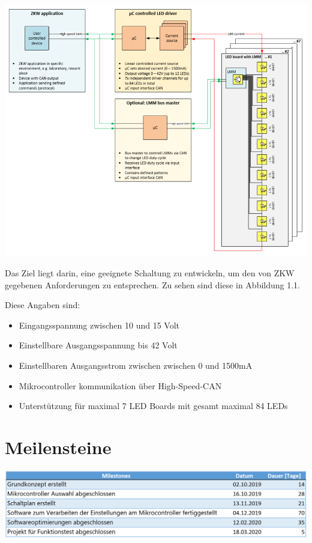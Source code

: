 \documentclass[paper=a4, 12pt]{scrreprt}
\begin{document}
	\begin{adjustbox}{center,caption={Blockschaltbild von ZKW},label={ZKW-Blockschaltbild},nofloat=figure,vspace=\bigskipamount}
	\includegraphics[width=15cm]{img/ZKW_Blockschaltbild.PNG}
	\end{adjustbox}

	Das Ziel liegt darin, eine geeignete Schaltung zu entwickeln, um den von ZKW gegebenen Anforderungen zu entsprechen. Zu sehen sind diese in Abbildung 1.1.
	
	Diese Angaben sind:
	\begin{itemize}
		\item{Eingangsspannung zwischen 10 und 15 Volt}
		\item{Einstellbare Ausgangsspannung bis 42 Volt}
		\item{Einstellbaren Ausgangsstrom zwischen zwischen 0 und 1500mA}
		\item{Mikrocontroller kommunikation über High-Speed-CAN}
		\item{Unterstützung für maximal 7 LED Boards mit gesamt maximal 84 LEDs}
	\end{itemize}
	
	\section{Meilensteine}\hfill \break
	\begin{adjustbox}{center,nofloat=figure,vspace=\bigskipamount}
	\includegraphics[width=\textwidth]{img/meilensteine.PNG}
	\end{adjustbox}
	
\end{document}

